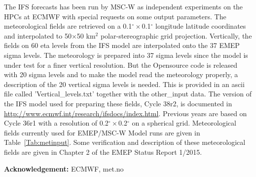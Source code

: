 The IFS forecasts has been run by MSC-W as
independent experiments on the HPCs at ECMWF with special requests on
some output parameters. The meteorological fields are retrieved on a
0.1$^{\circ}\times$0.1$^{\circ}$ longitude latitude coordinates and interpolated to
50$\times$50 km$^2$ polar-stereographic grid projection. Vertically, the fields
on 60 eta levels from the IFS model are interpolated onto the 37 EMEP sigma
levels.  The meteorology is prepared into 37 sigma levels since the model is 
under test for a finer vertical resolution.  But the Opensource code is released
with 20 sigma levels and to make the model read the meteorology properly, 
a description of the 20 vertical sigma levels is needed.  This is provided in 
an ascii file called 'Vertical\_levels.txt' together with the other\_input data. 
The version of the IFS model used for preparing these fields,
Cycle 38r2, is documented in \url{http://www.ecmwf.int/research/ifsdocs/index.html}. Previous years are based on Cycle 36r1 with a resolution of 0.2$^{\circ}\times$0.2$^{\circ}$ on a spherical grid. 
Meteorological fields currently used for EMEP/MSC-W Model runs are given in
Table~\ref{Tab:metinput}. Some verification and description of these
meteorological fields are given in Chapter 2 of the EMEP Status Report
1/2015.

{\bf Acknowledgement:} ECMWF, met.no


